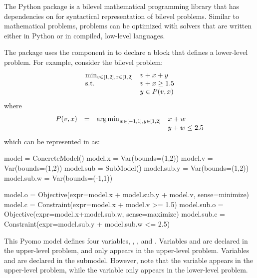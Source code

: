 The Python package  is a bilevel mathematical programming library that has dependencies on  for syntactical representation of bilevel problems. Similar to  mathematical problems,  problems can be optimized with solvers that are written either in Python or in compiled, low-level languages.

The  package uses the  component in  to declare a block that defines a lower-level problem. 
For example, consider the bilevel problem:
\begin{equation}
\label{eqn:bilevel_ex1}
\begin{array}{ll}
\min_{v \in [1,2], x \in [1,2]}   & v + x + y\\
\textrm{s.t.}                 & v + x\geq 1.5\\
                    & y \in P(v,x)
\end{array}
\end{equation}
where 
\[
\begin{array}{llll}
P(v,x) & = & \operatorname*{arg\,min}_{w \in [-1,1], y \in [1,2]}    & x + w\\
 & &                            &  y + w \leq 2.5
\end{array}
\]
which can be represented in  as:

\begin{qlisting}
model = ConcreteModel()
model.x = Var(bounds=(1,2))
model.v = Var(bounds=(1,2))
model.sub = SubModel()
model.sub.y = Var(bounds=(1,2))
model.sub.w = Var(bounds=(-1,1))

model.o = Objective(expr=model.x + model.sub.y + model.v, sense=minimize)
model.c = Constraint(expr=model.x + model.v >= 1.5)
model.sub.o = Objective(expr=model.x+model.sub.w, sense=maximize)
model.sub.c = Constraint(expr=model.sub.y + model.sub.w <= 2.5)
\end{qlisting}
This Pyomo model defines four variables,  , ,  and .
Variables   and  are declared in the upper-level
problem, and  only appears in the upper-level problem.
Variables  and  are declared in the submodel.
However, note that the  variable appears in the upper-level
problem, while the  variable only appears in the
lower-level problem.

